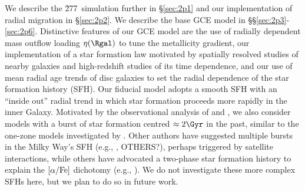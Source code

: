 We describe the \h277\ simulation further in \S\ref{sec:2p1} and our
implementation of radial migration in \S\ref{sec:2p2}.
We describe the base GCE model in \S\S\ref{sec:2p3}-\ref{sec:2p6}.
Distinctive features of our GCE model are the use of radially dependent
mass outflow loading $\eta(\Rgal)$ to tune the metallicity gradient,
our implementation of a star formation law motivated by spatially resolved
studies of nearby galaxies and high-redshift studies of its time dependence,
and our use of mean radial age trends of disc galaxies to set the radial
dependence of the star formation history (SFH).  Our fiducial model adopts
a smooth SFH with an ``inside out'' radial trend in which star formation
proceeds more rapidly in the inner Galaxy.  Motivated by the observational
analysis of \cite{Isern2019} and \cite{Mor2019}, we also consider models with
a burst of star formation centred $\approx 2\Gyr$ in the past, similar to 
the one-zone models investigated by \cite{Johnson2020}.  Other authors have
suggested multiple bursts in the Milky Way's SFH 
(e.g., \citealt{Lian2020a,Lian2020b,Sysoliatina2021}, OTHERS?),
perhaps triggered by satellite interactions, while others have advocated
a two-phase star formation history to explain the $[\alpha/{\rm Fe}]$ dichotomy
(e.g., \citealt{Chiappini1997,Haywood2016,Spitoni2019,Buck2020,Khoperskov2021}).
We do not investigate these more complex SFHs here, but we plan to do so
in future work.

